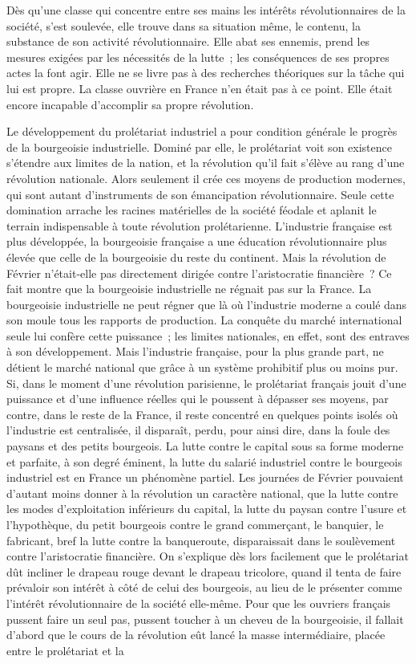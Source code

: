 \documentclass[french,twoside]{book} %
\begin{document}
Dès qu’une classe qui concentre entre ses mains les intérêts révolutionnaires de la société, s’est soulevée, elle trouve dans sa situation même, le contenu, la substance de son activité révolutionnaire. Elle abat ses ennemis, prend les mesures exigées par les nécessités de la lutte ; les conséquences de ses propres actes la font agir. Elle ne se livre pas à des recherches théoriques sur la tâche qui lui est propre. La classe ouvrière en France n’en était pas à ce point. Elle était encore incapable d’accomplir sa propre révolution.\par
Le développement du prolétariat industriel a pour condition générale le progrès de la bourgeoisie industrielle. Dominé par elle, le prolétariat voit son existence s’étendre aux limites de la nation, et la révolution qu’il fait s’élève au rang d’une révolution nationale. Alors seulement il crée ces moyens de production modernes, qui sont autant d’instruments de son émancipation révolutionnaire. Seule cette domination arrache les racines matérielles de la société féodale et aplanit le terrain indispensable à toute révolution prolétarienne. L’industrie française est plus développée, la bourgeoisie française a une éducation révolutionnaire plus élevée que celle de la bourgeoisie du reste du continent. Mais la révolution de Février n’était-elle pas directement dirigée contre l’aristocratie financière ? Ce fait montre que la bourgeoisie industrielle ne régnait pas sur la France. La bourgeoisie industrielle ne peut régner que là où l’industrie moderne a coulé dans son moule tous les rapports de production. La conquête du marché international seule lui confère cette puissance ; les limites nationales, en effet, sont des entraves à son développement. Mais l’industrie française, pour la plus grande part, ne détient le marché national que grâce à un système prohibitif plus ou moins pur. Si, dans le moment d’une révolution parisienne, le prolétariat français jouit d’une puissance et d’une influence réelles qui le poussent à dépasser ses moyens, par contre, dans le reste de la France, il reste concentré en quelques points isolés où l’industrie est centralisée, il disparaît, perdu, pour ainsi dire, dans la foule des paysans et des petits bourgeois. La lutte contre le capital sous sa forme moderne et parfaite, à son degré éminent, la lutte du salarié industriel contre le bourgeois industriel est en France un phénomène partiel. Les journées de Février pouvaient d’autant moins donner à la révolution un caractère national, que la lutte contre les modes d’exploitation inférieurs du capital, la lutte du paysan contre l’usure et l’hypothèque, du petit bourgeois contre le grand commerçant, le banquier, le fabricant, bref la lutte contre la banqueroute, disparaissait dans le soulèvement contre l’aristocratie financière. On s’explique dès lors facilement que le prolétariat dût incliner le drapeau rouge devant le drapeau tricolore, quand il tenta de faire prévaloir son intérêt à côté de celui des bourgeois, au lieu de le présenter comme l’intérêt révolutionnaire de la société elle-même. Pour que les ouvriers français pussent faire un seul pas, pussent toucher à un cheveu de la bourgeoisie, il fallait d’abord que le cours de la révolution eût lancé la masse intermédiaire, placée entre le prolétariat et la 
\end{document}
